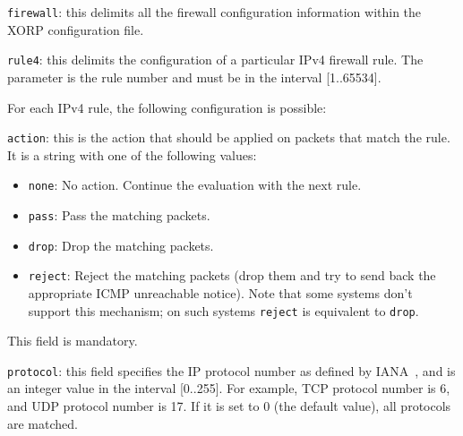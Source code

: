 \begin{description}
\item{\tt firewall}: this delimits all the firewall configuration
  information within the XORP configuration file.

\item{\tt rule4}: this delimits the configuration of a particular
  IPv4 firewall rule. The parameter is the rule number and must be
  in the interval [1..65534].

  For each IPv4 rule, the following configuration is possible:

\begin{description}

\item{\tt action}: this is the action that should be applied on packets
  that match the rule. It is a string with one of the following values:
\begin{itemize}
  \item {\tt none}: No action. Continue the evaluation with the next
  rule.
  \item {\tt pass}: Pass the matching packets.
  \item {\tt drop}: Drop the matching packets.
  \item {\tt reject}: Reject the matching packets (\ie drop them and try
  to send back the appropriate ICMP unreachable notice). Note that some
  systems don't support this mechanism; on such systems {\tt reject} is
  equivalent to {\tt drop}.
\end{itemize}

  This field is mandatory.

\item{\tt protocol}: this field specifies the IP protocol number as
  defined by IANA~\cite{IANA}, and is an integer value in the interval
  [0..255]. For example, TCP protocol number is 6, and UDP protocol
  number is 17. If it is set to 0 (the default value), all protocols are
  matched.


\end{description}
\end{description}

